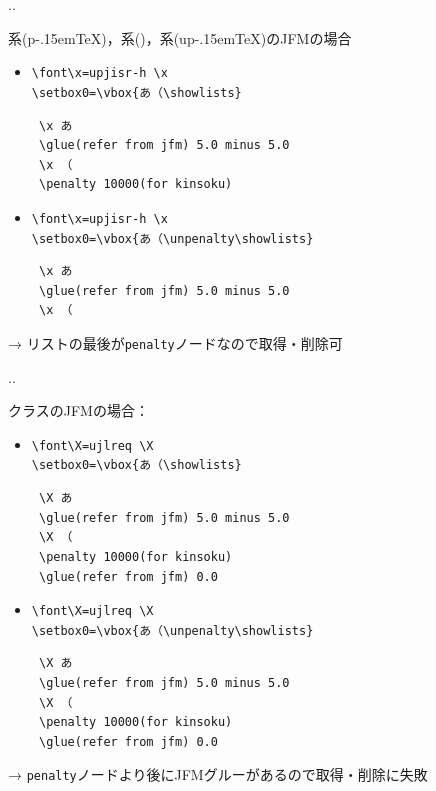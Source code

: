 \documentclass[a5paper,dvipdfmx,14pt]{beamer}
\def\cs#1{\texttt{\char92\nobreak#1}}
\def\pTeX{p\kern-.15em\TeX}
\def\upTeX{u\pTeX}
\begin{document}
\begin{frame}[t,fragile]{\insertsectionnumber.\insertsubsectionnumber. \insertsubsection}{}
{\footnotesize\def\verbnotesize{\scriptsize}
系(\pTeX)，系()，系(\upTeX)のJFMの場合
\begin{itemize}
  \item \verb+\font\x=upjisr-h \x+\\
        \verb+\setbox0=\vbox{あ（\showlists}+
\begin{verbnote}
\begin{verbatim}
 \x あ
 \glue(refer from jfm) 5.0 minus 5.0
 \x （
 \penalty 10000(for kinsoku)
\end{verbatim}
\end{verbnote}
\end{itemize}\vskip-20pt
\begin{itemize}
  \item \verb+\font\x=upjisr-h \x+\\
        \verb+\setbox0=\vbox{あ（\unpenalty\showlists}+
\begin{verbnote}
\begin{verbatim}
 \x あ
 \glue(refer from jfm) 5.0 minus 5.0
 \x （
\end{verbatim}
\end{verbnote}
\end{itemize}\vskip-20pt
→ リストの最後が\cs{penalty}ノードなので取得・削除可
}
\end{frame}

\begin{frame}[t,fragile]{\insertsectionnumber.\insertsubsectionnumber. \insertsubsection}{}
{\footnotesize\def\verbnotesize{\scriptsize}
クラスのJFMの場合：
\begin{itemize}
  \item \verb+\font\X=ujlreq \X+\\
        \verb+\setbox0=\vbox{あ（\showlists}+
\begin{verbnote}
\begin{verbatim}
 \X あ
 \glue(refer from jfm) 5.0 minus 5.0
 \X （
 \penalty 10000(for kinsoku)
 \glue(refer from jfm) 0.0
\end{verbatim}
\end{verbnote}
\end{itemize}\vskip-20pt
\begin{itemize}
  \item \verb+\font\X=ujlreq \X+\\
        \verb+\setbox0=\vbox{あ（\unpenalty\showlists}+
\begin{verbnote}
\begin{verbatim}
 \X あ
 \glue(refer from jfm) 5.0 minus 5.0
 \X （
 \penalty 10000(for kinsoku)
 \glue(refer from jfm) 0.0
\end{verbatim}
\end{verbnote}
\end{itemize}\vskip-20pt
→ \cs{penalty}ノードより後にJFMグルーがあるので取得・削除に失敗
}
\end{frame}
\end{document}

